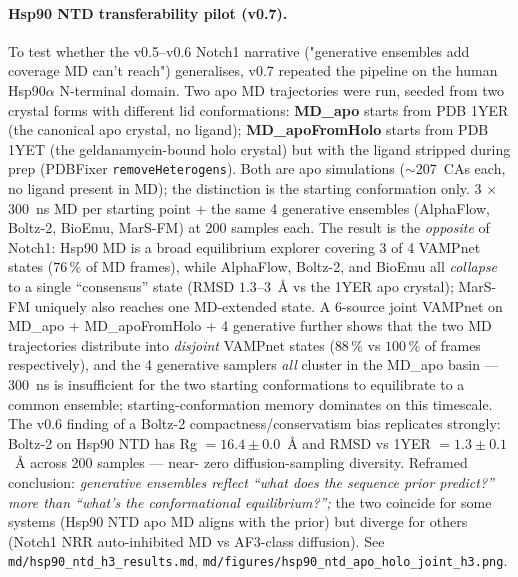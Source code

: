 \documentclass[11pt]{article}
\begin{document}
\begin{enumerate}[leftmargin=*,itemsep=2pt]
        \paragraph{Hsp90 NTD transferability pilot (v0.7).} To test
        whether the v0.5--v0.6 Notch1 narrative ("generative
        ensembles add coverage MD can't reach") generalises, v0.7
        repeated the pipeline on the human Hsp90$\alpha$
        N-terminal domain. Two apo MD trajectories were run, seeded
        from two crystal forms with different lid conformations:
        \textbf{MD\_apo} starts from PDB 1YER (the canonical apo
        crystal, no ligand); \textbf{MD\_apoFromHolo} starts from
        PDB 1YET (the geldanamycin-bound holo crystal) but with the
        ligand stripped during prep (PDBFixer
        \texttt{removeHeterogens}). Both are apo simulations
        ($\sim$207~CAs each, no ligand present in MD); the
        distinction is the starting conformation only. 3 $\times$
        300~ns MD per starting point + the same 4 generative
        ensembles (AlphaFlow, Boltz-2, BioEmu, MarS-FM) at 200
        samples each. The result is the \emph{opposite} of Notch1:
        Hsp90 MD is a broad equilibrium explorer covering 3 of 4
        VAMPnet states ($76\,\%$ of MD frames), while AlphaFlow,
        Boltz-2, and BioEmu all \emph{collapse} to a single
        ``consensus'' state (RMSD $1.3$--$3$~\AA{} vs the 1YER apo
        crystal); MarS-FM uniquely also reaches one MD-extended
        state. A 6-source joint VAMPnet on MD\_apo + MD\_apoFromHolo
        + 4 generative further shows that the two MD trajectories
        distribute into \emph{disjoint} VAMPnet states ($88\,\%$
        vs $100\,\%$ of frames respectively), and the 4 generative
        samplers \emph{all} cluster in the MD\_apo basin --- 300~ns
        is insufficient for the two starting conformations to
        equilibrate to a common ensemble; starting-conformation
        memory dominates on this timescale. The v0.6 finding of
        a Boltz-2 compactness/conservatism bias replicates strongly:
        Boltz-2 on Hsp90 NTD has Rg $= 16.4 \pm 0.0$~\AA{} and RMSD
        vs 1YER $= 1.3 \pm 0.1$~\AA{} across 200 samples --- near-
        zero diffusion-sampling diversity. Reframed conclusion:
        \emph{generative ensembles reflect ``what does the sequence
        prior predict?'' more than ``what's the conformational
        equilibrium?'';} the two coincide for some systems (Hsp90
        NTD apo MD aligns with the prior) but diverge for others
        (Notch1 NRR auto-inhibited MD vs AF3-class diffusion). See
        \texttt{md/hsp90\_ntd\_h3\_results.md},
        \texttt{md/figures/hsp90\_ntd\_apo\_holo\_joint\_h3.png}.


\end{enumerate}
\end{document}
